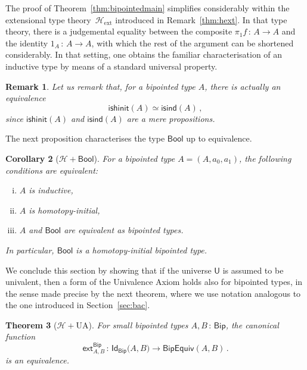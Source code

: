 \documentclass[10pt,a4paper,oneside,reqno]{amsart}
\numberwithin{equation}{section}
\theoremstyle{mythm}
\newtheorem{theorem}{Theorem}[section]
\newtheorem{corollary}[theorem]{Corollary}
\theoremstyle{mydef}
\theoremstyle{myrmk}
\newtheorem{remark}[theorem]{Remark}
\newcommand{\co}{\,{:}\,}
\newcommand{\Hint}{\mathcal{H}}
\newcommand{\Hext}{\mathcal{H}_{\mathrm{ext}}}
\newcommand{\isbipind}{\mathsf{isind}}
\newcommand{\isbiphinit}{\mathsf{ishinit}}
\newcommand{\ext}{\mathsf{ext}}
\newcommand{\Bool}{\mathsf{Bool}}
\newcommand{\Id}{\mathsf{Id}}
\newcommand{\U}{\mathsf{U}}
\newcommand{\Bip}{\mathsf{Bip}}
\newcommand{\BipEquiv}{\mathsf{BipEquiv}}
\begin{document}
The proof of Theorem~\ref{thm:bipointedmain} simplifies considerably within the extensional
type theory~$\Hext$ introduced in Remark~\ref{thm:hext}. In that type theory, 
there is a judgemental equality 
between the composite $\pi_1 f \co A \to A$ and the identity $1_A \co A \to A$, with which the
rest of the argument can be shortened considerably. In that setting, one obtains the familiar characterisation 
of an inductive type by means of a standard universal property.

\begin{remark} 
Let us remark that, for a bipointed type $A$, there is actually an equivalence  
\[
\isbiphinit(A) \simeq \isbipind(A) \, ,
\]
since $\isbiphinit(A)$ and $\isbipind(A)$ are a mere propositions. 
\end{remark} 

The next proposition characterises the
type $\Bool$ up to equivalence.



\begin{corollary}[$\Hint + \Bool$]  For a bipointed type $A = (A, a_0, a_1)$, the following 
conditions are equivalent:
\begin{enumerate}[(i)]
\item $A$ is inductive,
\item $A$ is homotopy-initial,
\item $A$ and $\Bool$ are equivalent as bipointed types.
\end{enumerate}
In particular, $\Bool$ is a homotopy-initial bipointed type.
\end{corollary}






We conclude this section by showing that if the universe $\U$ is assumed to be univalent, then a form of the Univalence Axiom holds also for bipointed types, in the sense made precise by the next theorem, where we
use notation analogous to the one introduced in Section~\ref{sec:bac}. 


\begin{theorem}[$\Hint + \mathrm{UA}$] \label{thm:bipunivalence}
For small bipointed types $A, B \co \Bip$, the  canonical function
\[ 
\ext^{\Bip}_{A,B} \co \Id_{\Bip} \big(A,B\big) \to  \BipEquiv(A,B) \, .
\] 
is an equivalence.
\end{theorem} 
\end{document}
